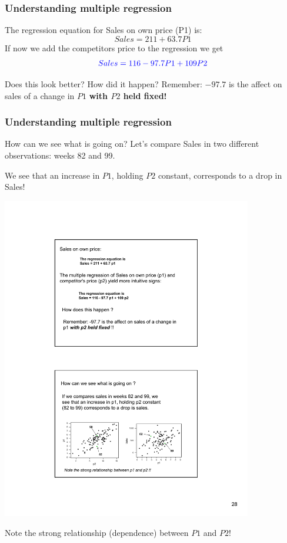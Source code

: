 \documentclass{beamer}
\newcommand{\sk}{\vspace{.5cm}}
\begin{document}
\begin{frame}
\frametitle{Understanding multiple regression}

The regression equation for Sales on own price (P1) is: \sk
$$
Sales = 211 + 63.7 P1
$$
If now we add the competitors price to the regression we get \sk
$${\color{blue} 
	Sales = 116 - 97.7P1 + 109 P2}
$$

\sk 
Does this look better? How did it happen?
Remember: $-97.7$ is the affect on sales of a change in $P1$ {\color{burntorange}\bf with $P2$ held fixed!}

\end{frame}

\begin{frame}
\frametitle{Understanding multiple regression}

How can we see what is going on? Let's compare Sales in two different observations: weeks 82 and 99. \sk

We see that an {\color{blue}increase} in $P1$, holding $P2$ {\color{blue}constant}, corresponds to a drop in Sales! 

\vspace{3mm}


\hspace*{0mm}\includegraphics[width=4.3in]{figures/Sales2}




\color{burntorange}Note the strong relationship (dependence) between $P1$ and $P2$!


\end{frame}
\end{document}

